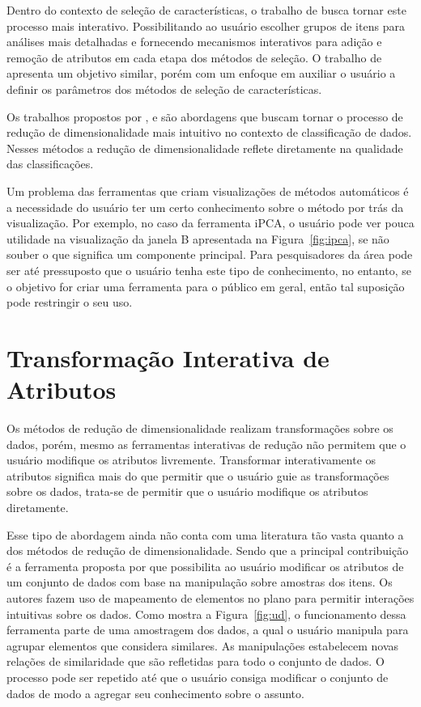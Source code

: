 Dentro do contexto de seleção de características, o trabalho
de \cite{Dy2000} busca tornar este processo mais interativo.
Possibilitando ao usuário escolher grupos de itens para
análises mais detalhadas e fornecendo mecanismos interativos
para adição e remoção de atributos em cada etapa dos métodos
de seleção. O trabalho de \cite{Brandoli2010} apresenta um
objetivo similar, porém com um enfoque em auxiliar o
usuário a definir os parâmetros dos métodos de seleção de
características.

Os trabalhos propostos por \cite{Choo2010}, \cite{Paiva2012}
e \cite{Zhang2006} são abordagens que buscam tornar o
processo de redução de dimensionalidade mais intuitivo no
contexto de classificação de dados. Nesses métodos a redução
de dimensionalidade reflete diretamente na qualidade das
classificações. 

Um problema das ferramentas que criam visualizações de métodos
automáticos é a necessidade do usuário ter um certo
conhecimento sobre o método por trás da visualização. Por
exemplo, no caso da ferramenta iPCA, o usuário pode ver
pouca utilidade na visualização da janela B apresentada na
Figura~\ref{fig:ipca}, se não souber o que significa um
componente principal. Para pesquisadores da área pode ser
até pressuposto que o usuário tenha este tipo de
conhecimento, no entanto, se o objetivo for criar uma
ferramenta para o público em geral, então tal suposição pode
restringir o seu uso.

\section{Transformação Interativa de Atributos}

Os métodos de redução de dimensionalidade realizam
transformações sobre os dados, porém, mesmo as ferramentas
interativas de redução não permitem que o usuário modifique
os atributos livremente. Transformar interativamente os
atributos significa mais do que permitir que o usuário
guie as transformações sobre os dados, trata-se de permitir
que o usuário modifique os atributos diretamente. 

Esse tipo de abordagem ainda não conta com uma literatura
tão vasta quanto a dos métodos de redução de
dimensionalidade.  Sendo que a principal contribuição é a
ferramenta proposta por \cite{Gladys2013} que possibilita ao
usuário modificar os atributos de um conjunto de dados com
base na manipulação sobre amostras dos itens. Os autores
fazem uso de mapeamento de elementos no plano para permitir
interações intuitivas sobre os dados. Como mostra a
Figura~\ref{fig:ud}, o funcionamento dessa ferramenta parte
de uma amostragem dos dados, a qual o usuário manipula para
agrupar elementos que considera similares. As manipulações
estabelecem novas relações de similaridade que são
refletidas para todo o conjunto de dados. O processo pode
ser repetido até que o usuário consiga modificar o conjunto
de dados de modo a agregar seu conhecimento sobre o assunto.


